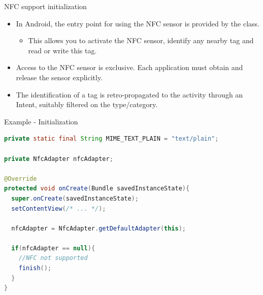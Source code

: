 \documentclass{beamer}
\begin{document}
  \begin{frame}{NFC support initialization}
    \begin{itemize}\itemsep20pt
      \item In Android, the entry point for using the NFC sensor is provided by
      the  class.
      \begin{itemize}
        \item This allows you to activate the NFC sensor, identify any nearby
        tag and read or write this tag.
      \end{itemize}
      \item Access to the NFC sensor is exclusive. Each application must obtain
      and release the sensor explicitly.
      \item The identification of a tag is retro-propagated to the activity
      through an Intent, suitably filtered on the type/category.
    \end{itemize}

    \begin{exampleblock}{Example - Initialization}
      \begin{lstlisting}[language=Java]
private static final String MIME_TEXT_PLAIN = "text/plain";

private NfcAdapter nfcAdapter;

@Override
protected void onCreate(Bundle savedInstanceState){
  super.onCreate(savedInstanceState);
  setContentView(/* ... */);
    
  nfcAdapter = NfcAdapter.getDefaultAdapter(this);
  
  if(nfcAdapter == null){
    //NFC not supported
    finish();
  }
}
      \end{lstlisting}
    \end{exampleblock}

  \end{frame}
\end{document}
